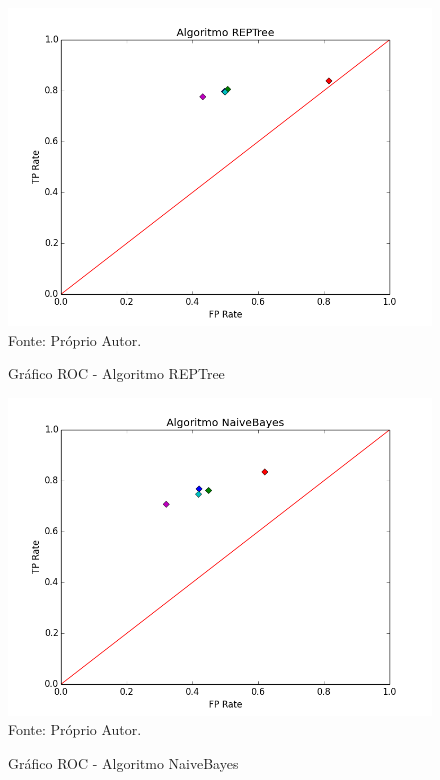 \documentclass[
	12pt,				%
	openright,			%
	oneside,	
	a4paper,				%
	english,				%
	brazil				%
]{abntex2/abntex2} %
\begin{document}
	\pagebreak
	\clearpage
	\newpage
	
	
	\begin{figure}[!htb]
		\caption{\label{figRocREPTree} Gráfico ROC - Algoritmo REPTree}
		\begin{center}
			\includegraphics[scale=0.8]{python/REPTree.png}
			Fonte: Próprio Autor.
		\end{center}
	\end{figure}
	
	\begin{figure}[!htb]
		\caption{\label{figRocNaiveBayes} Gráfico ROC - Algoritmo NaiveBayes}
		\begin{center}
			\includegraphics[scale=0.8]{python/NaiveBayes.png}
			Fonte: Próprio Autor.
		\end{center}
	\end{figure}
	
\end{document}
